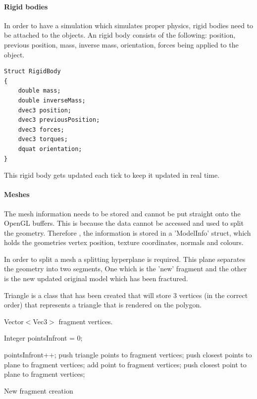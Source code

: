 \documentclass[conference,backref=page]{acmsiggraph}
\begin{document}
\paragraph{Rigid bodies} \hfill

In order to have a simulation which simulates proper physics, rigid bodies need to be attached to the objects. An rigid body consists of the following: position, previous position, mass, inverse mass, orientation, forces being applied to the object. 
\begin{lstlisting}
Struct RigidBody
{
	double mass;
	double inverseMass;
	dvec3 position;
	dvec3 previousPosition;
	dvec3 forces;
	dvec3 torques;
	dquat orientation;
}
\end{lstlisting}

This rigid body gets updated each tick to keep it updated in real time.

\paragraph{Meshes} \hfill

The mesh information needs to be stored and cannot be put straight onto the OpenGL buffers. This is because the data cannot be accessed and used to split the geometry. Therefore , the information is stored in a 'ModelInfo' struct, which holds the geometries vertex position, texture coordinates, normals and colours.
 
In order to split a mesh a splitting hyperplane is required. This plane separates the geometry into two segments, One which is the 'new' fragment and the other is the new updated original model which has been fractured. 

Triangle is a class that has been created that will store 3 vertices (in the correct order) that represents a triangle that is rendered on the polygon.

\begin{algorithm}
Vector$<$Vec3$>$ fragment vertices.  \hfill

{
		Integer pointsInfront = 0; \hfill 
		
		{
			{
				pointsInfront++;
			}
		}
	{
		push triangle points to fragment vertices;
	}
	{
		push closest points to plane to fragment vertices;
	}
		{
			{
				add point to fragment vertices; 
			}	
			\Else
			{
				push closest point to plane to fragment vertices;
			}
		}
	}
 \caption{New fragment creation}
\end{algorithm}
\end{document}
